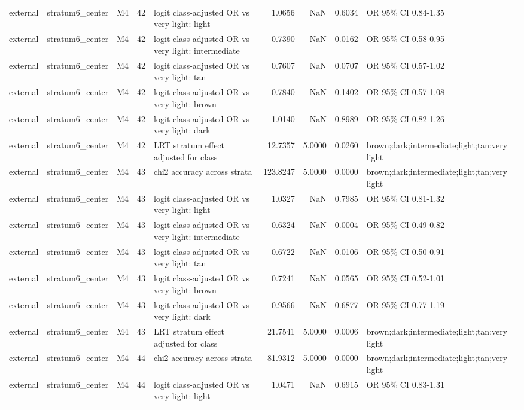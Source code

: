 \begin{tabular}{lllrlrrrl}
external & stratum6\_center & M4 & 42 & logit class-adjusted OR vs very light: light & 1.0656 & NaN & 0.6034 & OR 95\% CI 0.84-1.35 \\
external & stratum6\_center & M4 & 42 & logit class-adjusted OR vs very light: intermediate & 0.7390 & NaN & 0.0162 & OR 95\% CI 0.58-0.95 \\
external & stratum6\_center & M4 & 42 & logit class-adjusted OR vs very light: tan & 0.7607 & NaN & 0.0707 & OR 95\% CI 0.57-1.02 \\
external & stratum6\_center & M4 & 42 & logit class-adjusted OR vs very light: brown & 0.7840 & NaN & 0.1402 & OR 95\% CI 0.57-1.08 \\
external & stratum6\_center & M4 & 42 & logit class-adjusted OR vs very light: dark & 1.0140 & NaN & 0.8989 & OR 95\% CI 0.82-1.26 \\
external & stratum6\_center & M4 & 42 & LRT stratum effect adjusted for class & 12.7357 & 5.0000 & 0.0260 & brown;dark;intermediate;light;tan;very light \\
external & stratum6\_center & M4 & 43 & chi2 accuracy across strata & 123.8247 & 5.0000 & 0.0000 & brown;dark;intermediate;light;tan;very light \\
external & stratum6\_center & M4 & 43 & logit class-adjusted OR vs very light: light & 1.0327 & NaN & 0.7985 & OR 95\% CI 0.81-1.32 \\
external & stratum6\_center & M4 & 43 & logit class-adjusted OR vs very light: intermediate & 0.6324 & NaN & 0.0004 & OR 95\% CI 0.49-0.82 \\
external & stratum6\_center & M4 & 43 & logit class-adjusted OR vs very light: tan & 0.6722 & NaN & 0.0106 & OR 95\% CI 0.50-0.91 \\
external & stratum6\_center & M4 & 43 & logit class-adjusted OR vs very light: brown & 0.7241 & NaN & 0.0565 & OR 95\% CI 0.52-1.01 \\
external & stratum6\_center & M4 & 43 & logit class-adjusted OR vs very light: dark & 0.9566 & NaN & 0.6877 & OR 95\% CI 0.77-1.19 \\
external & stratum6\_center & M4 & 43 & LRT stratum effect adjusted for class & 21.7541 & 5.0000 & 0.0006 & brown;dark;intermediate;light;tan;very light \\
external & stratum6\_center & M4 & 44 & chi2 accuracy across strata & 81.9312 & 5.0000 & 0.0000 & brown;dark;intermediate;light;tan;very light \\
external & stratum6\_center & M4 & 44 & logit class-adjusted OR vs very light: light & 1.0471 & NaN & 0.6915 & OR 95\% CI 0.83-1.31 \\

\end{tabular}
